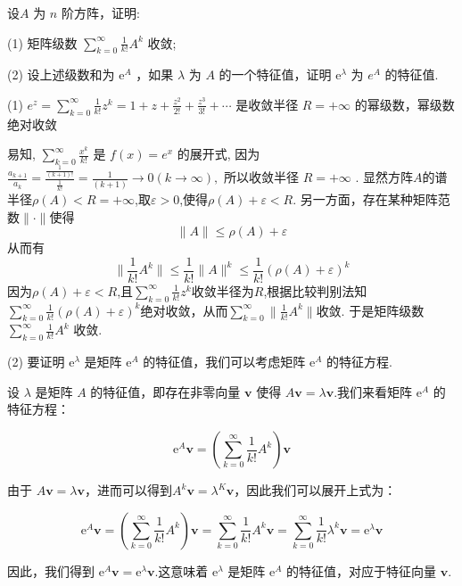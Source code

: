 \begin{tcolorbox}[breakable,
		colframe=white!10!jingga, coltitle=white!90!jingga, colback=white!95!jingga, coltext=black, colbacktitle=white!10!jingga, enhanced, fonttitle=\bfseries,fontupper=\normalsize, attach boxed title to top left={yshift=-2mm}, before skip=8pt, after skip=8pt,
		title=解答题]
 

设$ A $ 为 $ n $ 阶方阵，证明:

(1) 矩阵级数 $ \sum\limits_{{k}=0}^{\infty} \frac{1}{{k} !} {A}^{{k}} $ 收敛;

(2) 设上述级数和为 $ \mathrm{e}^{{A}} $ ，如果 $ \lambda $ 为 $ {A} $ 的一个特征值，证明 $ \mathrm{e}^{\lambda} $ 为 $ e^{A} $ 的特征值.

 \tcblower

(1) $e^{z}=\sum\limits_{k=0}^{\infty}\frac{1}{{k} !} z^k=1+z+\frac{z^{2}}{2 !}+\frac{z^{3}}{3 !}+\cdots $ 是收敛半径 $ R=+\infty $ 的幂级数，幂级数绝对收敛

易知, $ \sum\limits_{k=0}^{\infty} \frac{x^{k}}{k !} $ 是 $ f(x)=e^{x} $ 的展开式, 因为$ \frac{a_{k+1}}{a_{k}}=\frac{\frac{1}{(k+1) !}}{\frac{1}{k !}}=\frac{1}{(k+1)} \rightarrow 0(k \rightarrow \infty),  $ 所以收敛半径 $ R=+\infty $ .
显然方阵$A$的谱半径$\rho(A)<R=+\infty$,取$\varepsilon >0$,使得$\rho(A)+\varepsilon<R$. 另一方面，存在某种矩阵范数$\|\cdot\|$使得
$$\|A\|\leqslant \rho(A)+\varepsilon$$
从而有$$\|\frac{1}{k!}A^k\|\leqslant \frac{1}{k!}\|A\|^k\leqslant \frac{1}{k!}(\rho(A)+\varepsilon)^k$$
因为$\rho(A)+\varepsilon<R$,且$\sum\limits_{k=0}^{\infty}\frac{1}{{k} !} z^k$收敛半径为$R$,根据比较判别法知$\sum\limits_{k=0}^{\infty}\frac{1}{k!}(\rho(A)+\varepsilon)^k$绝对收敛，从而$\sum\limits_{k=0}^{\infty}\|\frac{1}{k!}A^k\|$收敛.
于是矩阵级数 $ \sum\limits_{{k}=0}^{\infty} \frac{1}{{k} !} {A}^{{k}} $ 收敛.

(2) 要证明 $ \mathrm{e}^{\lambda} $ 是矩阵 $ \mathrm{e}^{A} $ 的特征值，我们可以考虑矩阵 $ \mathrm{e}^{A} $ 的特征方程.

设 $ \lambda $ 是矩阵 $ A $ 的特征值，即存在非零向量 $ \mathbf{v} $ 使得 $ A\mathbf{v} = \lambda\mathbf{v} $.我们来看矩阵 $ \mathrm{e}^{A} $ 的特征方程：

$$
\mathrm{e}^{A}\mathbf{v} = \left( \sum\limits_{{k}=0}^{\infty} \frac{1}{{k} !} {A}^{{k}} \right) \mathbf{v}
$$

由于 $ A\mathbf{v} = \lambda\mathbf{v} $，进而可以得到$A^k\mathbf{v} = \lambda^K\mathbf{v}$，因此我们可以展开上式为：

$$
\mathrm{e}^{A}\mathbf{v} = \left( \sum\limits_{{k}=0}^{\infty} \frac{1}{{k} !} {A}^{{k}} \right) \mathbf{v} = \sum\limits_{{k}=0}^{\infty} \frac{1}{{k} !} {A}^{{k}}\mathbf{v} = \sum\limits_{{k}=0}^{\infty} \frac{1}{{k} !} \lambda^{k}\mathbf{v} = \mathrm{e}^{\lambda}\mathbf{v}
$$

因此，我们得到 $ \mathrm{e}^{A}\mathbf{v} = \mathrm{e}^{\lambda}\mathbf{v} $.这意味着 $ \mathrm{e}^{\lambda} $ 是矩阵 $ \mathrm{e}^{A} $ 的特征值，对应于特征向量 $ \mathbf{v} $.





\end{tcolorbox}




